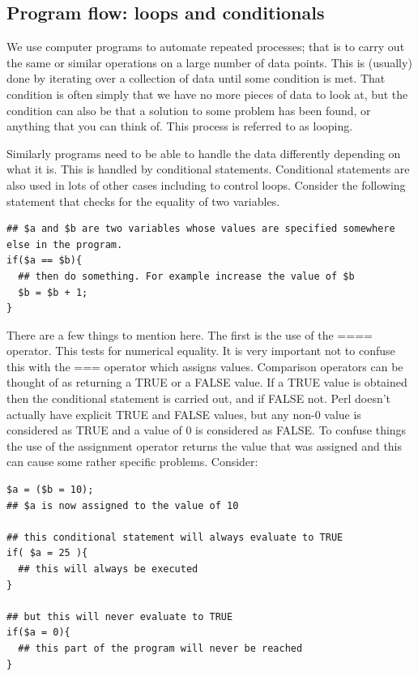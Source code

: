 \documentclass[11pt]{article}
\begin{document}
\subsection{Program flow: loops and conditionals}
\label{sec-5-4}


We use computer programs to automate repeated processes; that is to
carry out the same or similar operations on a large number of data
points. This is (usually) done by iterating over a collection of data
until some condition is met. That condition is often simply that we have
no more pieces of data to look at, but the condition can also be that a
solution to some problem has been found, or anything that you can think
of. This process is referred to as looping.

Similarly programs need to be able to handle the data differently
depending on what it is. This is handled by conditional statements.
Conditional statements are also used in lots of other cases including to
control loops. Consider the following statement that checks for the
equality of two variables.


\begin{verbatim}
## $a and $b are two variables whose values are specified somewhere else in the program.
if($a == $b){
  ## then do something. For example increase the value of $b
  $b = $b + 1;
}
\end{verbatim}

There are a few things to mention here. The first is the use of the ====
operator. This tests for numerical equality. It is very important not to
confuse this with the === operator which assigns values. Comparison
operators can be thought of as returning a TRUE or a FALSE value. If a
TRUE value is obtained then the conditional statement is carried out,
and if FALSE not. Perl doesn't actually have explicit TRUE and FALSE
values, but any non-0 value is considered as TRUE and a value of 0 is
considered as FALSE. To confuse things the use of the assignment
operator returns the value that was assigned and this can cause some
rather specific problems. Consider:


\begin{verbatim}
$a = ($b = 10);
## $a is now assigned to the value of 10

## this conditional statement will always evaluate to TRUE
if( $a = 25 ){
  ## this will always be executed
}

## but this will never evaluate to TRUE
if($a = 0){
  ## this part of the program will never be reached
}
\end{verbatim}
\end{document}

